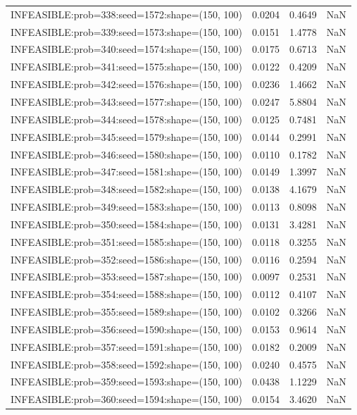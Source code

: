 \begin{longtable}{lccc}
INFEASIBLE:prob=338:seed=1572:shape=(150, 100) & 0.0204 &  0.4649 &    NaN \\
INFEASIBLE:prob=339:seed=1573:shape=(150, 100) & 0.0151 &  1.4778 &    NaN \\
INFEASIBLE:prob=340:seed=1574:shape=(150, 100) & 0.0175 &  0.6713 &    NaN \\
INFEASIBLE:prob=341:seed=1575:shape=(150, 100) & 0.0122 &  0.4209 &    NaN \\
INFEASIBLE:prob=342:seed=1576:shape=(150, 100) & 0.0236 &  1.4662 &    NaN \\
INFEASIBLE:prob=343:seed=1577:shape=(150, 100) & 0.0247 &  5.8804 &    NaN \\
INFEASIBLE:prob=344:seed=1578:shape=(150, 100) & 0.0125 &  0.7481 &    NaN \\
INFEASIBLE:prob=345:seed=1579:shape=(150, 100) & 0.0144 &  0.2991 &    NaN \\
INFEASIBLE:prob=346:seed=1580:shape=(150, 100) & 0.0110 &  0.1782 &    NaN \\
INFEASIBLE:prob=347:seed=1581:shape=(150, 100) & 0.0149 &  1.3997 &    NaN \\
INFEASIBLE:prob=348:seed=1582:shape=(150, 100) & 0.0138 &  4.1679 &    NaN \\
INFEASIBLE:prob=349:seed=1583:shape=(150, 100) & 0.0113 &  0.8098 &    NaN \\
INFEASIBLE:prob=350:seed=1584:shape=(150, 100) & 0.0131 &  3.4281 &    NaN \\
INFEASIBLE:prob=351:seed=1585:shape=(150, 100) & 0.0118 &  0.3255 &    NaN \\
INFEASIBLE:prob=352:seed=1586:shape=(150, 100) & 0.0116 &  0.2594 &    NaN \\
INFEASIBLE:prob=353:seed=1587:shape=(150, 100) & 0.0097 &  0.2531 &    NaN \\
INFEASIBLE:prob=354:seed=1588:shape=(150, 100) & 0.0112 &  0.4107 &    NaN \\
INFEASIBLE:prob=355:seed=1589:shape=(150, 100) & 0.0102 &  0.3266 &    NaN \\
INFEASIBLE:prob=356:seed=1590:shape=(150, 100) & 0.0153 &  0.9614 &    NaN \\
INFEASIBLE:prob=357:seed=1591:shape=(150, 100) & 0.0182 &  0.2009 &    NaN \\
INFEASIBLE:prob=358:seed=1592:shape=(150, 100) & 0.0240 &  0.4575 &    NaN \\
INFEASIBLE:prob=359:seed=1593:shape=(150, 100) & 0.0438 &  1.1229 &    NaN \\
INFEASIBLE:prob=360:seed=1594:shape=(150, 100) & 0.0154 &  3.4620 &    NaN \\

\end{longtable}
